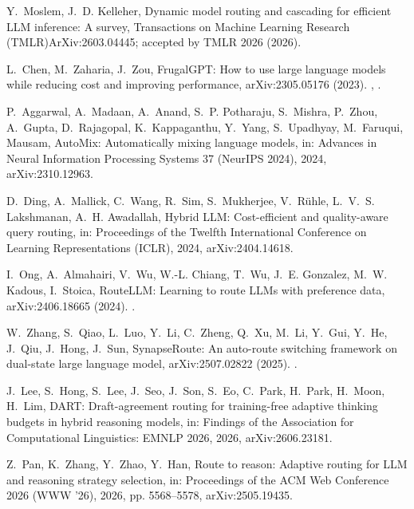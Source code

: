 \documentclass[final,5p,times,twocolumn]{elsarticle}
\theoremstyle{plain}
\begin{document}
Y.~Moslem, J.~D. Kelleher, Dynamic model routing and cascading for efficient
  {LLM} inference: A survey, Transactions on Machine Learning Research
  (TMLR)ArXiv:2603.04445; accepted by TMLR 2026 (2026).

L.~Chen, M.~Zaharia, J.~Zou, {FrugalGPT}: How to use large language models
  while reducing cost and improving performance, arXiv:2305.05176 (2023).
\newblock \href {http://arxiv.org/abs/2305.05176} {},
  \href {https://doi.org/10.48550/arXiv.2305.05176}
  {}.

P.~Aggarwal, A.~Madaan, A.~Anand, S.~P. Potharaju, S.~Mishra, P.~Zhou,
  A.~Gupta, D.~Rajagopal, K.~Kappaganthu, Y.~Yang, S.~Upadhyay, M.~Faruqui,
  Mausam, {AutoMix}: Automatically mixing language models, in: Advances in
  Neural Information Processing Systems 37 (NeurIPS 2024), 2024,
  arXiv:2310.12963.

D.~Ding, A.~Mallick, C.~Wang, R.~Sim, S.~Mukherjee, V.~R{\"u}hle, L.~V.~S.
  Lakshmanan, A.~H. Awadallah, Hybrid {LLM}: Cost-efficient and quality-aware
  query routing, in: Proceedings of the Twelfth International Conference on
  Learning Representations (ICLR), 2024, arXiv:2404.14618.

I.~Ong, A.~Almahairi, V.~Wu, W.-L. Chiang, T.~Wu, J.~E. Gonzalez, M.~W. Kadous,
  I.~Stoica, {RouteLLM}: Learning to route {LLMs} with preference data,
  arXiv:2406.18665 (2024).
\newblock \href {http://arxiv.org/abs/2406.18665} {}.

W.~Zhang, S.~Qiao, L.~Luo, Y.~Li, C.~Zheng, Q.~Xu, M.~Li, Y.~Gui, Y.~He,
  J.~Qiu, J.~Hong, J.~Sun, {SynapseRoute}: An auto-route switching framework on
  dual-state large language model, arXiv:2507.02822 (2025).
\newblock \href {http://arxiv.org/abs/2507.02822} {}.

J.~Lee, S.~Hong, S.~Lee, J.~Seo, J.~Son, S.~Eo, C.~Park, H.~Park, H.~Moon,
  H.~Lim, {DART}: Draft-agreement routing for training-free adaptive thinking
  budgets in hybrid reasoning models, in: Findings of the Association for
  Computational Linguistics: EMNLP 2026, 2026, arXiv:2606.23181.

Z.~Pan, K.~Zhang, Y.~Zhao, Y.~Han, Route to reason: Adaptive routing for {LLM}
  and reasoning strategy selection, in: Proceedings of the ACM Web Conference
  2026 (WWW '26), 2026, pp. 5568--5578, arXiv:2505.19435.
\end{document}
